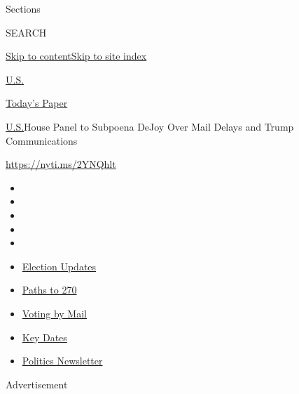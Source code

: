 Sections

SEARCH

\protect\hyperlink{site-content}{Skip to
content}\protect\hyperlink{site-index}{Skip to site index}

\href{https://www.nytimes3xbfgragh.onion/section/us}{U.S.}

\href{https://myaccount.nytimes3xbfgragh.onion/auth/login?response_type=cookie\&client_id=vi}{}

\href{https://www.nytimes3xbfgragh.onion/section/todayspaper}{Today's
Paper}

\href{/section/us}{U.S.}\textbar{}House Panel to Subpoena DeJoy Over
Mail Delays and Trump Communications

\url{https://nyti.ms/2YNQhlt}

\begin{itemize}
\item
\item
\item
\item
\item
\end{itemize}

\begin{itemize}
\item
  \href{https://www.nytimes3xbfgragh.onion/live/2020/09/08/us/trump-vs-biden?action=click\&pgtype=Article\&state=default\&region=TOP_BANNER\&context=storylines_menu}{Election
  Updates}
\item
  \href{https://www.nytimes3xbfgragh.onion/interactive/2020/us/elections/election-states-biden-trump.html?action=click\&pgtype=Article\&state=default\&region=TOP_BANNER\&context=storylines_menu}{Paths
  to 270}
\item
  \href{https://www.nytimes3xbfgragh.onion/interactive/2020/08/31/us/politics/vote-by-mail-deadlines.html?action=click\&pgtype=Article\&state=default\&region=TOP_BANNER\&context=storylines_menu}{Voting
  by Mail}
\item
  \href{https://www.nytimes3xbfgragh.onion/interactive/2019/us/elections/2020-presidential-election-calendar.html?action=click\&pgtype=Article\&state=default\&region=TOP_BANNER\&context=storylines_menu}{Key
  Dates}
\item
  \href{https://www.nytimes3xbfgragh.onion/newsletters/politics?action=click\&pgtype=Article\&state=default\&region=TOP_BANNER\&context=storylines_menu}{Politics
  Newsletter}
\end{itemize}

Advertisement

